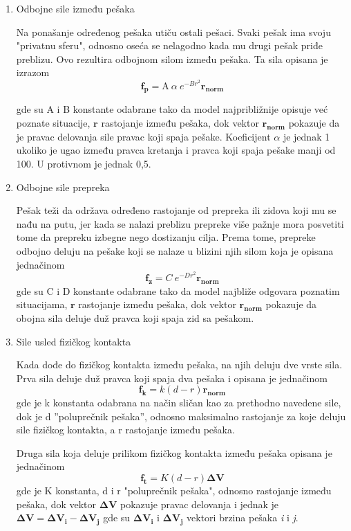 \documentclass[12pt]{article}
\begin{document}
\begin{enumerate}

\item Odbojne sile između pešaka 

Na ponašanje određenog pešaka utiču ostali pešaci. Svaki pešak ima svoju "privatnu sferu", odnosno oseća se nelagodno kada mu drugi pešak priđe preblizu. Ovo rezultira odbojnom silom između pešaka. Ta sila opisana je izrazom
$$
\mathbf{f_{p}}=\mathrm{A}\ \alpha\ e^{-Br^2}\mathbf{r_{norm}}
$$

gde su A i B konstante odabrane tako da model najpribližnije opisuje već poznate situacije, $\mathbf r$ rastojanje između pešaka, dok vektor $\mathbf{r_{norm}}$ pokazuje da je pravac delovanja sile pravac koji spaja pešake. Koeficijent $\alpha$ je jednak 1 ukoliko je ugao između pravca kretanja i pravca koji spaja pešake manji od 100\degree. U protivnom je jednak 0,5.


\item Odbojne sile prepreka

Pešak teži da održava određeno rastojanje od prepreka ili zidova koji mu se nađu na putu, jer kada se nalazi preblizu prepreke više pažnje mora posvetiti tome da prepreku izbegne nego dostizanju cilja. Prema tome, prepreke odbojno deluju na pešake koji se nalaze u blizini njih silom koja je opisana jednačinom
$$
\mathbf{f_{z}}=C\ e^{-Dr^2}\mathbf{r_{norm}}
$$
gde su C i D konstante odabrane tako da model najbliže odgovara poznatim situacijama, $\mathbf r$ rastojanje između pešaka, dok vektor $\mathbf{r_{norm}}$ pokazuje da obojna sila deluje duž pravca koji spaja zid sa pešakom. 

\item Sile usled fizičkog kontakta

Kada dođe do fizičkog kontakta između pešaka, na njih deluju dve vrste sila. Prva sila deluje duž pravca koji spaja dva pešaka i opisana je jednačinom
$$
\mathbf{f_k}=k(d-r)\mathbf{r_{norm}}
$$
gde je k konstanta odabrana na način sličan kao za prethodno navedene sile, dok je d ''poluprečnik pešaka'', odnosno maksimalno rastojanje za koje deluju sile fizičkog kontakta, a r rastojanje između pešaka.

Druga sila koja deluje prilikom fizičkog kontakta između pešaka opisana je jednačinom
$$
\mathbf{f_t}=K(d-r)\mathbf{\Delta V}
$$
gde je K konstanta, d i r "poluprečnik pešaka", odnosno rastojanje između pešaka, dok vektor $\mathbf{\Delta V}$ pokazuje pravac delovanja i jednak je $\mathbf{\Delta V}=\mathbf{\Delta V_i}-\mathbf{\Delta V_j}$ gde su $\mathbf{\Delta V_i}$ i $\mathbf{\Delta V_j}$ vektori brzina pešaka \emph{i} i \emph{j}.
\end{enumerate}
\end{document}
